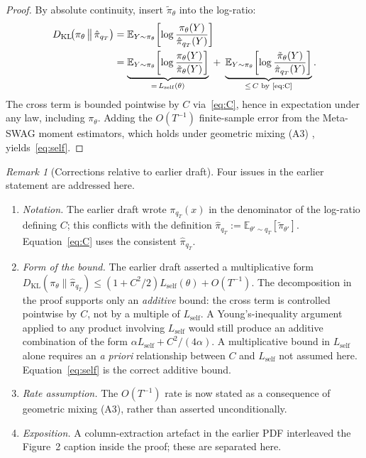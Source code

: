 \documentclass[10pt]{article}
\theoremstyle{plain}
\theoremstyle{definition}
\theoremstyle{remark}
\newtheorem{remark}[theorem]{Remark}
\newcommand{\E}{\mathbb{E}}
\newcommand{\KL}{D_{\mathrm{KL}}}
\begin{document}
\begin{proof}
By absolute continuity, insert $\tilde\pi_\theta$ into the log-ratio:
\begin{align*}
\KL\!\bigl(\pi_\theta \,\big\|\, \hat\pi_{q_T}\bigr)
&= \E_{Y\sim\pi_\theta}\!\left[\log\frac{\pi_\theta(Y)}{\hat\pi_{q_T}(Y)}\right] \\
&= \underbrace{\E_{Y\sim\pi_\theta}\!\left[\log\frac{\pi_\theta(Y)}{\tilde\pi_\theta(Y)}\right]}_{=\, L_{\mathrm{self}}(\theta)}
\;+\; \underbrace{\E_{Y\sim\pi_\theta}\!\left[\log\frac{\tilde\pi_\theta(Y)}{\hat\pi_{q_T}(Y)}\right]}_{\le\, C \text{ by \eqref{eq:C}}}.
\end{align*}
The cross term is bounded pointwise by $C$ via~\eqref{eq:C}, hence in expectation under any law, including $\pi_\theta$. Adding the $O(T^{-1})$ finite-sample error from the Meta-SWAG moment estimators, which holds under geometric mixing (A3) \citep{maddox2019swag}, yields~\eqref{eq:self}.
\end{proof}

\begin{remark}[Corrections relative to earlier draft]\label{rem:self-corrections}
Four issues in the earlier statement are addressed here.
\begin{enumerate}[leftmargin=1.8em,itemsep=0.15em,label=\textup{(\arabic*)}]
  \item \emph{Notation.} The earlier draft wrote $\pi_{q_T}(x)$ in the denominator of the log-ratio defining $C$; this conflicts with the definition $\hat\pi_{q_T} := \E_{\theta'\sim q_T}[\tilde\pi_{\theta'}]$. Equation~\eqref{eq:C} uses the consistent $\hat\pi_{q_T}$.
  \item \emph{Form of the bound.} The earlier draft asserted a multiplicative form $\KL(\pi_\theta\|\hat\pi_{q_T}) \le (1+C^2/2)L_{\mathrm{self}}(\theta) + O(T^{-1})$. The decomposition in the proof supports only an \emph{additive} bound: the cross term is controlled pointwise by $C$, not by a multiple of $L_{\mathrm{self}}$. A Young's-inequality argument applied to any product involving $L_{\mathrm{self}}$ would still produce an additive combination of the form $\alpha L_{\mathrm{self}} + C^2/(4\alpha)$. A multiplicative bound in $L_{\mathrm{self}}$ alone requires an \emph{a priori} relationship between $C$ and $L_{\mathrm{self}}$ not assumed here. Equation~\eqref{eq:self} is the correct additive bound.
  \item \emph{Rate assumption.} The $O(T^{-1})$ rate is now stated as a consequence of geometric mixing (A3), rather than asserted unconditionally.
  \item \emph{Exposition.} A column-extraction artefact in the earlier PDF interleaved the Figure~2 caption inside the proof; these are separated here.
\end{enumerate}
\end{remark}
\end{document}
